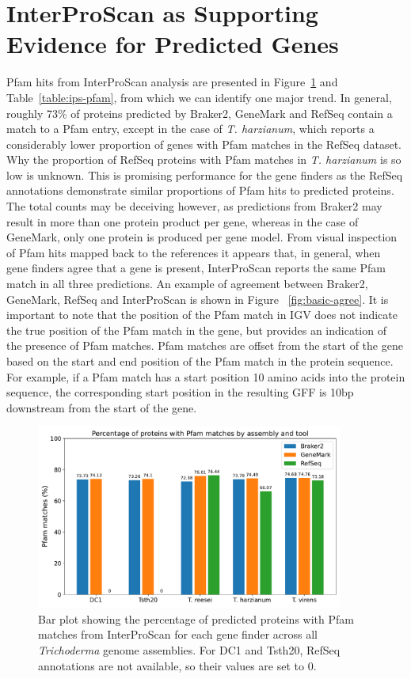 \section{InterProScan as Supporting Evidence for Predicted Genes}\label{section:interproscan}

Pfam hits from InterProScan analysis are presented in
Figure~\ref{fig:ips-counts} and Table~\ref{table:ips-pfam}, from
which we can identify one major trend. In general, roughly 73\% of
proteins predicted by Braker2, GeneMark and RefSeq contain a match to
a Pfam entry, except in the case of \textit{T. harzianum}, which
reports a considerably lower proportion of genes with Pfam matches in
the RefSeq dataset. Why the proportion of RefSeq proteins with Pfam
matches in \textit{T. harzianum} is so low is unknown. This is
promising performance for the gene finders as the RefSeq annotations
demonstrate similar proportions of Pfam hits to predicted
proteins. The total counts may be deceiving however, as predictions
from Braker2 may result in more than one protein product per gene,
whereas in the case of GeneMark, only one protein is produced per gene
model. From visual inspection of Pfam hits mapped back to the
references it appears that, in general, when gene finders agree that a
gene is present, InterProScan reports the same Pfam match in all three
predictions. An example of agreement between Braker2, GeneMark, RefSeq
and InterProScan is shown in Figure ~\ref{fig:basic-agree}. It is
important to note that the position of the Pfam match in IGV does not
indicate the true position of the Pfam match in the gene, but provides
an indication of the presence of Pfam matches. Pfam matches are offset
from the start of the gene based on the start and end position of the
Pfam match in the protein sequence. For example, if a Pfam match has a
start position 10 amino acids into the protein sequence, the
corresponding start position in the resulting GFF is 10bp downstream
from the start of the gene.

\begin{figure}
  \centering
  \includegraphics[width=0.90\textwidth]{figures/interproscan-barplot.pdf}
  \caption[Percentage of proteins with Pfam matches]{Bar plot showing the percentage of predicted proteins with Pfam matches from InterProScan for each gene finder across all \textit{Trichoderma} genome assemblies. For DC1 and Tsth20, RefSeq annotations are not available, so their values are set to 0.}\label{fig:ips-counts}
\end{figure}

